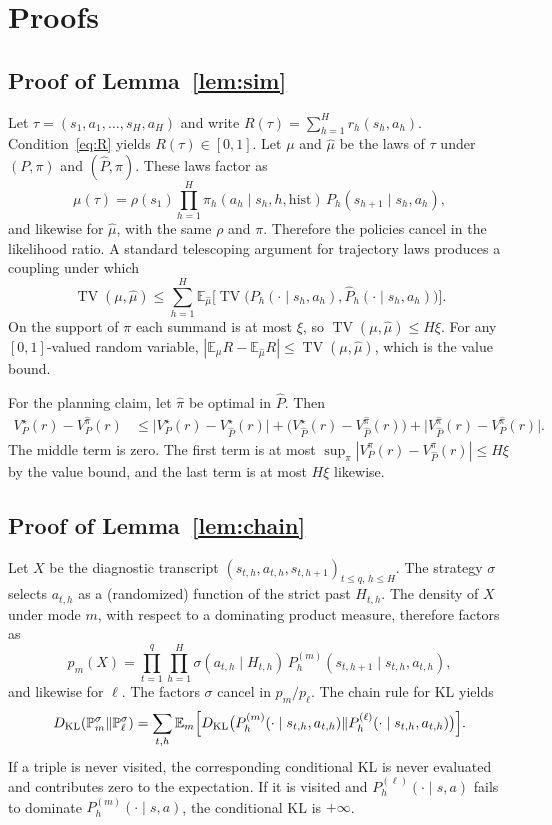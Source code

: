 \documentclass[11pt]{article}
\newcommand{\TV}{\operatorname{TV}}
\newcommand{\KL}{D_{\mathrm{KL}}}
\newcommand{\E}{\mathbb{E}}
\begin{document}
\section{Proofs}
\label{app:proofs}

\subsection{Proof of Lemma~\ref{lem:sim}}
Let $\tau=(s_1,a_1,\ldots,s_H,a_H)$ and write $R(\tau)=\sum_{h=1}^H r_h(s_h,a_h)$.
Condition~\eqref{eq:R} yields $R(\tau)\in[0,1]$. Let $\mu$ and $\widehat\mu$
be the laws of $\tau$ under $(P,\pi)$ and $(\widehat P,\pi)$. These laws
factor as
\[
\mu(\tau)=\rho(s_1)\prod_{h=1}^H \pi_h(a_h\mid s_h,h,\mathrm{hist})\,
P_h(s_{h+1}\mid s_h,a_h),
\]
and likewise for $\widehat\mu$, with the same $\rho$ and $\pi$. Therefore the
policies cancel in the likelihood ratio. A standard telescoping argument for trajectory laws
\citep{jaksch2010near} produces a coupling under which
\[
\TV(\mu,\widehat\mu)
\le \sum_{h=1}^H \E_{\widehat\mu}
\bigl[\TV\bigl(P_h(\cdot\mid s_h,a_h),\widehat P_h(\cdot\mid s_h,a_h)\bigr)\bigr].
\]
On the support of $\pi$ each summand is at most $\xi$, so $\TV(\mu,\widehat\mu)\le H\xi$.
For any $[0,1]$-valued random variable, $|\E_\mu R-\E_{\widehat\mu} R|\le \TV(\mu,\widehat\mu)$,
which is the value bound.

For the planning claim, let $\widehat\pi$ be optimal in $\widehat P$. Then
\begin{align*}
V_P^\star(r)-V_P^{\widehat\pi}(r)
&\le
\bigl|V_P^\star(r)-V_{\widehat P}^\star(r)\bigr|
+
\bigl(V_{\widehat P}^\star(r)-V_{\widehat P}^{\widehat\pi}(r)\bigr)
+
\bigl|V_{\widehat P}^{\widehat\pi}(r)-V_P^{\widehat\pi}(r)\bigr|.
\end{align*}
The middle term is zero. The first term is at most
$\sup_\pi |V_P^\pi(r)-V_{\widehat P}^\pi(r)|\le H\xi$ by the value bound, and
the last term is at most $H\xi$ likewise.

\subsection{Proof of Lemma~\ref{lem:chain}}
Let $X$ be the diagnostic transcript
$(s_{t,h},a_{t,h},s_{t,h+1})_{t\le q,\,h\le H}$. The strategy $\sigma$
selects $a_{t,h}$ as a (randomized) function of the strict past
$H_{t,h}$. The density of $X$ under mode $m$, with respect to a dominating
product measure, therefore factors as
\[
p_m(X)
=\prod_{t=1}^q\prod_{h=1}^H
\sigma(a_{t,h}\mid H_{t,h})\,
P_h^{(m)}(s_{t,h+1}\mid s_{t,h},a_{t,h}),
\]
and likewise for $\ell$. The factors $\sigma$ cancel in $p_m/p_\ell$. The
chain rule for KL \citep[Theorem~2.5.3]{cover2006elements} yields
\[
\KL(\mathbb{P}_m^\sigma\Vert\mathbb{P}_\ell^\sigma)
=\sum_{t,h}
\E_m\Bigl[
\KL\bigl(P_h^{(m)}(\cdot\mid s_{t,h},a_{t,h})
\Vert P_h^{(\ell)}(\cdot\mid s_{t,h},a_{t,h})\bigr)\Bigr].
\]
If a triple is never visited, the corresponding conditional KL is never
evaluated and contributes zero to the expectation. If it is visited and
$P_h^{(\ell)}(\cdot\mid s,a)$ fails to dominate $P_h^{(m)}(\cdot\mid s,a)$,
the conditional KL is $+\infty$.
\end{document}

